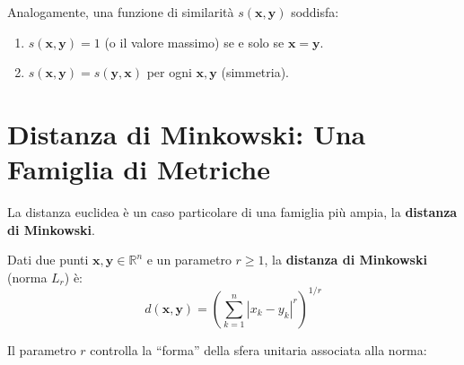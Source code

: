 Analogamente, una funzione di similarità $s(\mathbf{x}, \mathbf{y})$ soddisfa:
\begin{enumerate}
  \item $s(\mathbf{x}, \mathbf{y}) = 1$ (o il valore massimo) se e solo se $\mathbf{x} = \mathbf{y}$.
  \item $s(\mathbf{x}, \mathbf{y}) = s(\mathbf{y}, \mathbf{x})$ per ogni $\mathbf{x}, \mathbf{y}$ (simmetria).
\end{enumerate}

\section{Distanza di Minkowski: Una Famiglia di Metriche}
\label{sec:minkowski}

La distanza euclidea è un caso particolare di una famiglia più ampia, la \textbf{distanza di Minkowski}.

\begin{definition}
Dati due punti $\mathbf{x}, \mathbf{y} \in \mathbb{R}^n$ e un parametro $r \geq 1$, la \textbf{distanza di Minkowski} (norma $L_r$) è:
\begin{equation}
  d(\mathbf{x}, \mathbf{y}) = \left( \sum_{k=1}^{n} |x_k - y_k|^r \right)^{1/r}
  \label{eq:minkowski}
\end{equation}
\end{definition}

Il parametro $r$ controlla la ``forma'' della sfera unitaria associata alla norma:

